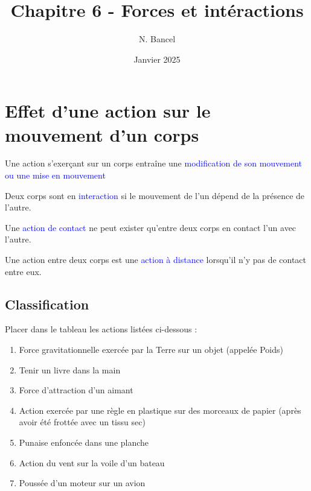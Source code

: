 \documentclass[a4paper,12pt]{article}
\begin{document}
\title{Chapitre 6 - Forces et intéractions}
\author{N. Bancel}
\date{Janvier 2025}
\maketitle

\section*{Effet d'une action sur le mouvement d'un corps}

\begin{compactitem}
  \item Une action s'exerçant sur un corps entraîne une \textcolor{blue}{modification de son mouvement ou une mise en mouvement}
  \item Deux corps sont en \textcolor{blue}{interaction} si le mouvement de l'un dépend de la présence de l'autre.
  \item Une \textcolor{blue}{action de contact} ne peut exister qu'entre deux corps en contact l'un avec l'autre. 
  \item Une action entre deux corps est une \textcolor{blue}{action à distance} lorsqu'il n'y pas de contact entre eux.
\end{compactitem}

\vspace{20em}


\subsection*{Classification}

Placer dans le tableau les actions listées ci-dessous : 

\begin{enumerate}[noitemsep]
  \item Force gravitationnelle exercée par la Terre sur un objet (appelée Poids)
  \item Tenir un livre dans la main
  \item Force d'attraction d'un aimant
  \item Action exercée par une règle en plastique sur des morceaux de papier (après avoir été frottée avec un tissu sec)
  \item Punaise enfoncée dans une planche
  \item Action du vent sur la voile d'un bateau
  \item Poussée d'un moteur sur un avion
\end{enumerate}
\end{document}
